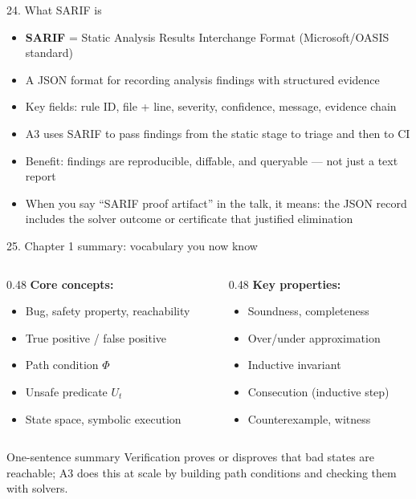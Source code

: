 \documentclass[aspectratio=169]{beamer}
\begin{document}
\begin{frame}{24. What SARIF is}
\begin{itemize}
  \item \textbf{SARIF} = Static Analysis Results Interchange Format (Microsoft/OASIS standard)
  \item A JSON format for recording analysis findings with structured evidence
  \item Key fields: rule ID, file + line, severity, confidence, message, evidence chain
  \item A3 uses SARIF to pass findings from the static stage to triage and then to CI
  \item Benefit: findings are reproducible, diffable, and queryable --- not just a text report
  \item When you say ``SARIF proof artifact'' in the talk, it means: the JSON record includes the solver outcome or certificate that justified elimination
\end{itemize}
\end{frame}

\begin{frame}{25. Chapter 1 summary: vocabulary you now know}
\begin{columns}
\begin{column}{0.48\textwidth}
\textbf{Core concepts:}
\begin{itemize}
  \item Bug, safety property, reachability
  \item True positive / false positive
  \item Path condition \(\Phi\)
  \item Unsafe predicate \(U_t\)
  \item State space, symbolic execution
\end{itemize}
\end{column}
\begin{column}{0.48\textwidth}
\textbf{Key properties:}
\begin{itemize}
  \item Soundness, completeness
  \item Over/under approximation
  \item Inductive invariant
  \item Consecution (inductive step)
  \item Counterexample, witness
\end{itemize}
\end{column}
\end{columns}
\vspace{0.3em}
\begin{block}{One-sentence summary}
Verification proves or disproves that bad states are reachable; A3 does this at scale by building
path conditions and checking them with solvers.
\end{block}
\end{frame}
\end{document}
